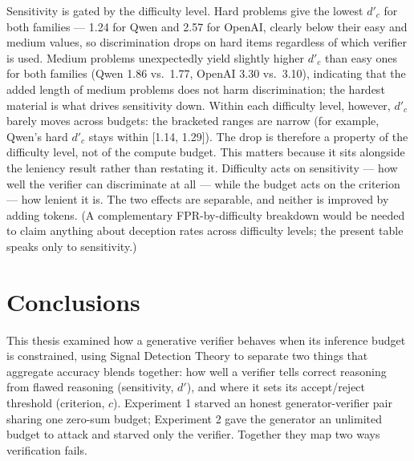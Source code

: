 \documentclass[12pt, a4paper, oneside]{report}
\begin{document}
\begin{table}[H]
\centering

\caption{Mean corrected sensitivity $d'_c$ by problem difficulty (averaged over budget ratios), with range across ratios in brackets. $d'_c$ per difficulty tier from \S\ref{sec:sdt-computation} (with the FN label correction of \S\ref{sec:fn-correction}), averaged over budget ratios; the bracketed range gives $[\min_R d'_c,\, \max_R d'_c]$. Sensitivity is difficulty-gated and roughly budget-invariant within each level (the bracketed ranges are narrow).}
\label{tab:dprime_difficulty}
\end{table}

Sensitivity is gated by the difficulty level. Hard problems give the lowest $d'_c$ for both
families — 1.24 for Qwen and 2.57 for OpenAI, clearly below their easy and medium values,
so discrimination drops on hard items regardless of which verifier is used. Medium problems unexpectedly yield slightly higher $d'_c$ than easy ones for both families (Qwen 1.86 vs.\ 1.77, OpenAI 3.30 vs.\ 3.10), indicating that the added length of medium problems does not harm discrimination; the hardest material is what drives sensitivity down. Within each
difficulty level, however, $d'_c$ barely moves across budgets: the bracketed ranges are narrow
(for example, Qwen's hard $d'_c$ stays within [1.14, 1.29]). The drop is therefore a property of
  the difficulty level, not of the compute budget.
This matters because it sits alongside the leniency result rather than restating it. 
Difficulty acts on sensitivity — how well the verifier can discriminate at all — while
 the budget acts on the criterion — how lenient it is. The two effects are separable, 
 and neither is improved by adding tokens. (A complementary FPR-by-difficulty breakdown 
 would be needed to claim anything about deception rates across difficulty levels; the 
 present table speaks only to sensitivity.)






\chapter{Conclusions}

This thesis examined how a generative verifier behaves when its inference budget is constrained, 
using Signal Detection Theory to separate two things that aggregate accuracy blends together: 
how well a verifier tells correct reasoning from flawed reasoning (sensitivity, $d'$), and where
 it sets its accept/reject threshold (criterion, $c$). Experiment 1 starved an honest 
 generator-verifier pair sharing one zero-sum budget; Experiment 2 gave the generator an unlimited 
 budget to attack and starved only the verifier. Together they map two ways verification fails.
\end{document}
